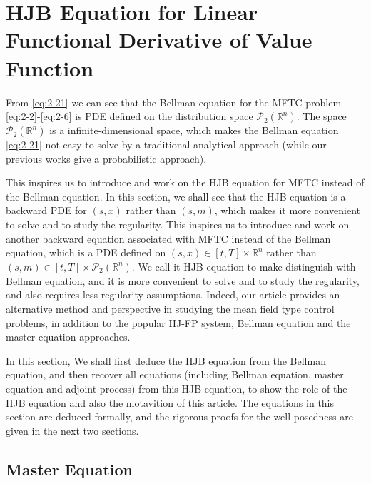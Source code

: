 \documentclass[11pt]{article}
\numberwithin{equation}{section}
\newcommand{\pr}{\mathcal{P}}
\newcommand{\brn}{{\mathbb{R}^n}}
\newcommand{\1}{\mbox{1\hspace{-1mm}I}}
\begin{document}
\section{HJB Equation for Linear Functional Derivative of Value Function}\label{sec:HJB}

From \eqref{eq:2-21} we can see that the Bellman equation for the MFTC problem \eqref{eq:2-2}-\eqref{eq:2-6} is PDE defined on the distribution space $\pr_2(\brn)$. The space $\pr_2(\brn)$ is a infinite-dimensional space, which makes the Bellman equation \eqref{eq:2-21} not easy to solve by a traditional analytical approach (while our previous works \cite{AB8,AB10,AB5} give a probabilistic approach). 

This inspires us to introduce and work on the HJB equation for MFTC instead of the Bellman equation. In this section, we shall see that the HJB equation is a backward PDE for $(s,x)$ rather than $(s,m)$, which makes it more convenient to solve and to study the regularity. This inspires us to introduce and work on another backward equation associated with MFTC instead of the Bellman equation, which is a PDE defined on $(s,x)\in[t,T]\times\brn$ rather than $(s,m)\in[t,T]\times\pr_2(\brn)$. We call it HJB equation to make distinguish with Bellman equation, and it is more convenient to solve and to study the regularity, and also requires less regularity assumptions. Indeed, our article provides an alternative method and perspective in studying the mean field type control problems, in addition to the popular HJ-FP system, Bellman equation and the master equation approaches. 

In this section, We shall first deduce the HJB equation from the Bellman equation, and then recover all equations (including Bellman equation, master equation and adjoint process) from this HJB equation, to show the role of the HJB equation and also the motavition of this article. The equations in this section are deduced formally, and the rigorous proofs for the well-posedness are given in the next two sections. 

\subsection{Master Equation}
\end{document}

